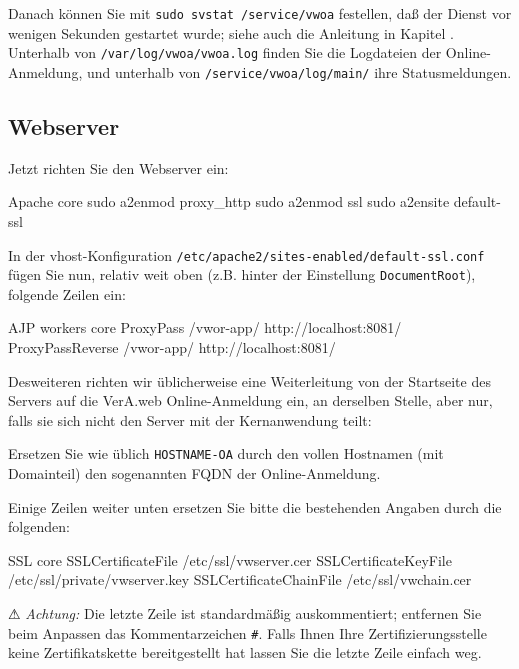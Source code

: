 \documentclass{tarentanleitung}
\begin{document}
Danach können Sie mit \texttt{sudo svstat /service/vwoa} festellen,
daß der Dienst vor wenigen Sekunden gestartet wurde; siehe
auch die Anleitung in Kapitel .
Unterhalb von \texttt{/var/log/vwoa/vwoa.log} finden Sie die
Logdateien der Online-Anmeldung, und unterhalb von
\texttt{/service/vwoa/log/main/} ihre Statusmeldungen.

\subsection{Webserver}\label{subsec:setup-oa-apache}

\begin{minipage}{\linewidth}
Jetzt richten Sie den Webserver ein:

\begin{lstdump}{Apache core}
sudo a2enmod proxy_http
sudo a2enmod ssl
sudo a2ensite default-ssl
\end{lstdump}
\end{minipage}

\begin{minipage}{\linewidth}
In der vhost-Konfiguration \texttt{/etc/apache2/sites-enabled/default-ssl.conf}
fügen Sie nun, relativ weit oben (z.B. hinter der Einstellung
\texttt{DocumentRoot}), folgende Zeilen ein:

\begin{lstdump}{AJP workers core}
ProxyPass /vwor-app/ http://localhost:8081/
ProxyPassReverse /vwor-app/ http://localhost:8081/
\end{lstdump}
\end{minipage}

\begin{minipage}{\linewidth}
Desweiteren richten wir üblicherweise eine Weiterleitung von der
Startseite des Servers auf die VerA.web Online-Anmeldung ein, an
derselben Stelle, aber nur, falls sie sich nicht den Server mit
der Kernanwendung teilt:

\end{minipage}

Ersetzen Sie wie üblich \texttt{HOSTNAME-OA} durch den vollen
Hostnamen (mit Domainteil) \dash den sogenannten FQDN \dash der
Online-Anmeldung.

\begin{minipage}{\linewidth}
Einige Zeilen weiter unten ersetzen Sie bitte die bestehenden
Angaben durch die folgenden:

\begin{lstdump}{SSL core}
SSLCertificateFile /etc/ssl/vwserver.cer
SSLCertificateKeyFile /etc/ssl/private/vwserver.key
SSLCertificateChainFile /etc/ssl/vwchain.cer
\end{lstdump}

⚠ \emph{Achtung:} Die letzte Zeile ist standardmäßig auskommentiert;
entfernen Sie beim Anpassen das Kommentarzeichen \texttt{\#}. Falls
Ihnen Ihre Zertifizierungsstelle keine Zertifikatskette bereitgestellt
hat lassen Sie die letzte Zeile einfach weg.
\end{minipage}
\end{document}

